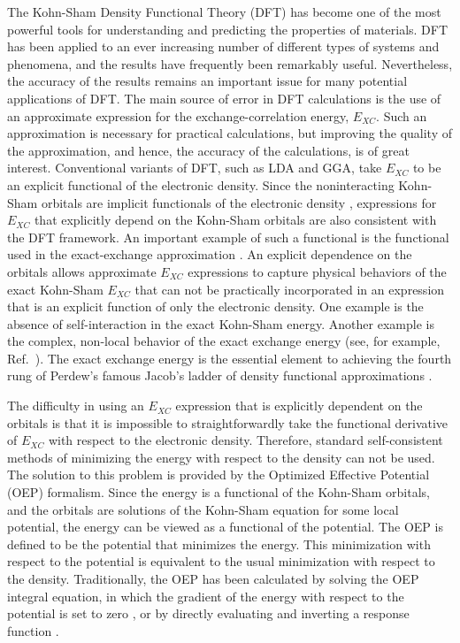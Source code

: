 \documentclass[12pt]{iopart}
\begin{document}
The Kohn-Sham Density Functional Theory (DFT) \cite{KohnSham:65} has become one of the
most powerful tools for understanding and predicting the properties of materials.  DFT has
been applied to an ever increasing number of different types of systems and
phenomena, and the results have frequently been remarkably useful.  Nevertheless,
the accuracy of the results remains an important issue for many potential
applications of DFT.  The main source of error in DFT calculations is the use
of an approximate expression for the exchange-correlation energy, $E_{XC}$.
Such an approximation is necessary for practical calculations, but improving
the quality of the approximation, and hence, the accuracy of the calculations,
is of great interest.  Conventional variants of DFT, such as LDA and GGA, take
$E_{XC}$ to be an explicit functional of the electronic density.  Since the
noninteracting Kohn-Sham orbitals are implicit functionals of the electronic
density \cite{HohenbergKohn:64},  expressions for $E_{XC}$ that explicitly
depend on the Kohn-Sham orbitals are also consistent with the DFT framework.
An important example of such a functional is the functional used in the exact-exchange
approximation
\cite{TalmanShadwick:76, SahniGruenebaumPerdew:82,EngelVosko:93,GorlingLevy:94,
Kotani:95,StadeleMajewskiVoglGorling:97,Gorling99}.  An explicit dependence
on the orbitals allows approximate $E_{XC}$ expressions to capture physical
behaviors of the exact Kohn-Sham $E_{XC}$ that can not be practically incorporated
in an expression that is an explicit function of only the electronic density.  One
example is the absence of self-interaction in the exact Kohn-Sham energy.
Another example is the complex, non-local behavior of the exact exchange energy
(see, for example, Ref.~\cite{KummelKronikPerdew:04}).  The exact
exchange energy is the essential element to achieving the fourth rung of Perdew's
famous Jacob's ladder of density functional approximations \cite{PerdewEtAl:05}.

The difficulty in using an $E_{XC}$ expression that is explicitly dependent on
the orbitals is that it is impossible to straightforwardly take the functional
derivative of $E_{XC}$ with respect to the electronic density.  Therefore,
standard self-consistent methods of minimizing the energy with respect to the
density can not be used.  The solution to this problem is provided by the
Optimized Effective Potential (OEP) formalism.  Since the energy is a functional
of the Kohn-Sham orbitals, and the orbitals are solutions of the Kohn-Sham
equation for some local potential, the energy can be viewed as a functional
of the potential.  The OEP is defined to be the potential that minimizes
the energy.  This minimization with respect to the potential is equivalent
to the usual minimization with respect to the density.  Traditionally, the OEP
has been calculated by solving the OEP integral equation, in which the gradient
of the energy with respect to the potential is set to zero \cite{TalmanShadwick:76,
SahniGruenebaumPerdew:82,EngelVosko:93,Kotani:95},
or by directly evaluating and inverting a response function \cite{GorlingLevy:94,
StadeleMajewskiVoglGorling:97,Gorling99}.
\end{document}
